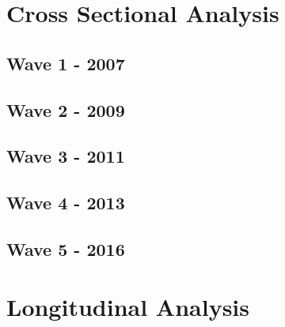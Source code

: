 \documentclass[
]{book}
\begin{document}
\hypertarget{cross-sectional-analysis}{%
\chapter{Cross Sectional Analysis}\label{cross-sectional-analysis}}

\hypertarget{wave-1---2007}{%
\section{Wave 1 - 2007}\label{wave-1---2007}}

\hypertarget{wave-2---2009}{%
\section{Wave 2 - 2009}\label{wave-2---2009}}

\hypertarget{wave-3---2011}{%
\section{Wave 3 - 2011}\label{wave-3---2011}}

\hypertarget{wave-4---2013}{%
\section{Wave 4 - 2013}\label{wave-4---2013}}

\hypertarget{wave-5---2016}{%
\section{Wave 5 - 2016}\label{wave-5---2016}}

\hypertarget{longitudinal-analysis}{%
\chapter{Longitudinal Analysis}\label{longitudinal-analysis}}

  
\end{document}
